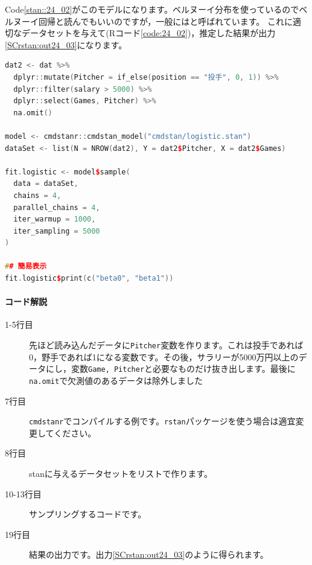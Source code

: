 \documentclass{ltjsbook}
\begin{document}
Code\ref{stan::24_02}がこのモデルになります。ベルヌーイ分布を使っているのでベルヌーイ回帰と読んでもいいのですが，一般にはと呼ばれています。
これに適切なデータセットを与えて(Rコード\ref{code:24_02})，推定した結果が出力\ref{SCrstan:out24_03}になります。

\begin{lstlisting}[language=c++,label={code:24_02},caption={ロジスティック回帰分析を実行するRコード}]
dat2 <- dat %>%
  dplyr::mutate(Pitcher = if_else(position == "投手", 0, 1)) %>%
  dplyr::filter(salary > 5000) %>%
  dplyr::select(Games, Pitcher) %>%
  na.omit()

model <- cmdstanr::cmdstan_model("cmdstan/logistic.stan")
dataSet <- list(N = NROW(dat2), Y = dat2$Pitcher, X = dat2$Games)

fit.logistic <- model$sample(
  data = dataSet,
  chains = 4,
  parallel_chains = 4,
  iter_warmup = 1000,
  iter_sampling = 5000
)

## 簡易表示
fit.logistic$print(c("beta0", "beta1"))
\end{lstlisting}
\paragraph{コード解説}
\begin{description}
	\item[1-5行目] 先ほど読み込んだデータに\verb|Pitcher|変数を作ります。これは投手であれば0，野手であれば1になる変数です。その後，サラリーが5000万円以上のデータにし，変数\verb|Game, Pitcher|と必要なものだけ抜き出します。最後に\verb|na.omit|で欠測値のあるデータは除外しました
	\item[7行目] \texttt{cmdstanr}でコンパイルする例です。\texttt{rstan}パッケージを使う場合は適宜変更してください。
	\item[8行目] stanに与えるデータセットをリストで作ります。
	\item[10-13行目] サンプリングするコードです。
	\item[19行目] 結果の出力です。出力\ref{SCrstan:out24_03}のように得られます。
\end{description}
\end{document}
